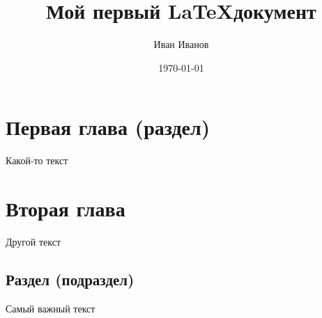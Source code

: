 \documentclass{article}
\author{Иван Иванов}
\title{Мой первый \LaTeX документ}
\date{\today} %
\begin{document}
\maketitle

\newpage

\tableofcontents{}
\newpage

\section{Первая глава (раздел)}
Какой-то текст
\section{Вторая глава}
Другой текст
\subsection{Раздел (подраздел)}
Самый важный текст
\end{document}
